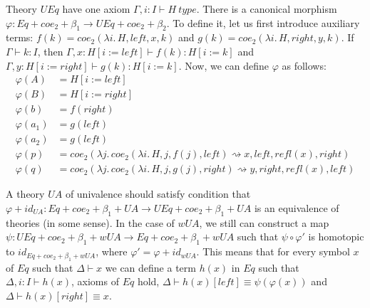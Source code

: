 \documentclass[reqno]{amsart}
\theoremstyle{definition}
\theoremstyle{remark}
\newcommand{\deq}{\equiv}
\newcommand{\repl}{:=}
\newcommand{\idtype}{\rightsquigarrow}
\numberwithin{figure}{section}
\begin{document}
Theory $UEq$ have one axiom $\Gamma, i : I \vdash H\ type$.
There is a canonical morphism $\varphi : Eq + coe_2 + \beta_1 \to UEq + coe_2 + \beta_2$.
To define it, let us first introduce auxiliary terms: $f(k) = coe_2(\lambda i.\,H, left, x, k)$ and $g(k) = coe_2(\lambda i.\,H, right, y, k)$.
If $\Gamma \vdash k : I$, then $\Gamma, x : H[i \repl left] \vdash f(k) : H[i \repl k]$ and $\Gamma, y : H[i \repl right] \vdash g(k) : H[i \repl k]$.
Now, we can define $\varphi$ as follows:
\begin{align*}
\varphi(A) & = H[i \repl left] \\
\varphi(B) & = H[i \repl right] \\
\varphi(b) & = f(right) \\
\varphi(a_1) & = g(left) \\
\varphi(a_2) & = g(left) \\
\varphi(p) & = coe_2(\lambda j.\,coe_2(\lambda i.\,H, j, f(j), left) \idtype x, left, refl(x), right) \\
\varphi(q) & = coe_2(\lambda j.\,coe_2(\lambda i.\,H, j, g(j), right) \idtype y, right, refl(x), left)
\end{align*}

A theory $UA$ of univalence should satisfy condition that $\varphi + id_{UA} : Eq + coe_2 + \beta_1 + UA \to UEq + coe_2 + \beta_1 + UA$ is an equivalence of theories (in some sense).
In the case of $wUA$, we still can construct a map $\psi : UEq + coe_2 + \beta_1 + wUA \to Eq + coe_2 + \beta_1 + wUA$ such that $\psi \circ \varphi'$ is homotopic to $id_{Eq + coe_2 + \beta_1 + wUA}$, where $\varphi' = \varphi + id_{wUA}$.
This means that for every symbol $x$ of $Eq$ such that $\Delta \vdash x$ we can define a term $h(x)$ in $Eq$ such that
$\Delta, i : I \vdash h(x)$, axioms of $Eq$ hold, $\Delta \vdash h(x)[left] \deq \psi(\varphi(x))$ and $\Delta \vdash h(x)[right] \deq x$.
\end{document}
